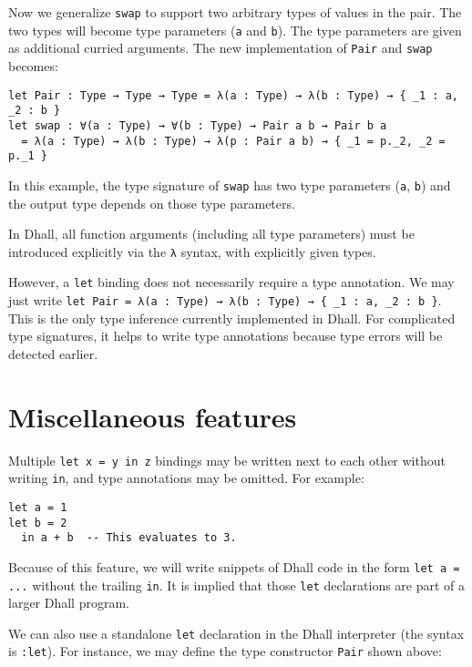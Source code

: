 Now we generalize \lstinline!swap! to support two arbitrary types of values in the pair.
The two types will become type parameters (\lstinline!a! and \lstinline!b!).
The type parameters are given as additional curried arguments.
The new implementation of \lstinline!Pair! and \lstinline!swap! becomes:


\begin{lstlisting}[language=Dhall]
let Pair : Type → Type → Type = λ(a : Type) → λ(b : Type) → { _1 : a, _2 : b }
let swap : ∀(a : Type) → ∀(b : Type) → Pair a b → Pair b a
  = λ(a : Type) → λ(b : Type) → λ(p : Pair a b) → { _1 = p._2, _2 = p._1 }
\end{lstlisting}


In this example, the type signature of \lstinline!swap! has two type parameters (\lstinline!a!, \lstinline!b!) and the output type depends on those type parameters.


In Dhall, all function arguments (including all type parameters) must be introduced explicitly via the \lstinline!λ! syntax, with explicitly given types.


However, a \lstinline!let! binding does not necessarily require a type annotation.
We may just write \lstinline!let Pair = λ(a : Type) → λ(b : Type) → { _1 : a, _2 : b }!.
This is the only type inference currently implemented in Dhall.
For complicated type signatures, it helps to write type annotations because type errors will be detected earlier.


\section{Miscellaneous features}


Multiple \lstinline!let x = y in z! bindings may be written next to each other without writing \lstinline!in!, and type annotations may be omitted.
For example:


\begin{lstlisting}[language=Dhall]
let a = 1
let b = 2
  in a + b  -- This evaluates to 3.
\end{lstlisting}


Because of this feature, we will write snippets of Dhall code in the form \lstinline!let a = ...! without the trailing \lstinline!in!.
It is implied that those \lstinline!let! declarations are part of a larger Dhall program.


We can also use a standalone \lstinline!let! declaration in the Dhall interpreter (the syntax is \lstinline!:let!).
For instance, we may define the type constructor \lstinline!Pair! shown above:


